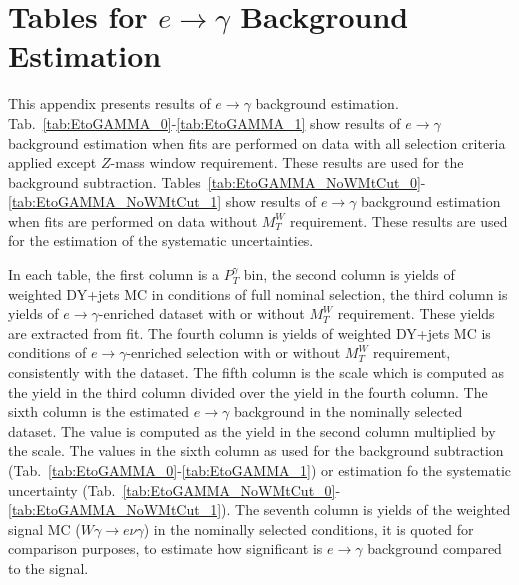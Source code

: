 \chapter{Tables for $e\rightarrow\gamma$ Background Estimation}
\label{sec:etogTables}

This appendix presents results of $e\rightarrow\gamma$ background estimation. Tab.~\ref{tab:EtoGAMMA_0}-\ref{tab:EtoGAMMA_1} show results of $e\rightarrow\gamma$ background estimation when fits are performed on data with all selection criteria applied except $Z$-mass window requirement. These results are used for the background subtraction. Tables~\ref{tab:EtoGAMMA_NoWMtCut_0}-\ref{tab:EtoGAMMA_NoWMtCut_1} show results of $e\rightarrow\gamma$ background estimation when fits are performed on data without $M_T^W$ requirement. These results are used for the estimation of the systematic uncertainties.

In each table, the first column is a $P_T^{\gamma}$ bin, the second column is yields of weighted DY+jets MC in conditions of full nominal selection, the third column is yields of $e\rightarrow\gamma$-enriched dataset with or without $M_T^W$ requirement. These yields are extracted from fit. The fourth column is yields of weighted DY+jets MC is conditions of $e\rightarrow\gamma$-enriched selection with or without $M_T^W$ requirement, consistently with the dataset. The fifth column is the scale which is computed as the yield in the third column divided over the yield in the fourth column. The sixth column is the estimated $e\rightarrow\gamma$ background in the nominally selected dataset. The value is computed as the yield in the second column multiplied by the scale. The values in the sixth column as used for the background subtraction  (Tab.~\ref{tab:EtoGAMMA_0}-\ref{tab:EtoGAMMA_1}) or estimation fo the systematic uncertainty (Tab.~\ref{tab:EtoGAMMA_NoWMtCut_0}-\ref{tab:EtoGAMMA_NoWMtCut_1}). The seventh column is yields of the weighted signal MC ($W\gamma\rightarrow e\nu\gamma$) in the nominally selected conditions, it is quoted for comparison purposes, to estimate how significant is $e\rightarrow\gamma$ background compared to the signal.

